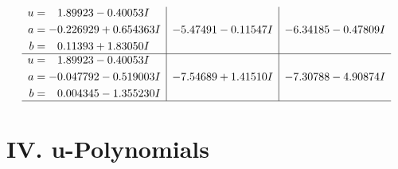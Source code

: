 \documentclass[1p]{elsarticle_modified}
\theoremstyle{definition}
\begin{document}
$$\begin{array}{c|c|c}
\begin{aligned}
u &= \phantom{-}1.89923 - 0.40053 I \\
a &= -0.226929 + 0.654363 I \\
b &= \phantom{-}0.11393 + 1.83050 I\end{aligned}
 & -5.47491 - 0.11547 I & -6.34185 - 0.47809 I \\ \hline\begin{aligned}
u &= \phantom{-}1.89923 - 0.40053 I \\
a &= -0.047792 - 0.519003 I \\
b &= \phantom{-}0.004345 - 1.355230 I\end{aligned}
 & -7.54689 + 1.41510 I & -7.30788 - 4.90874 I\\
 \hline 
 \end{array}$$\newpage
\newpage\renewcommand{\arraystretch}{1}
\centering \section*{ IV. u-Polynomials}
\end{document}

